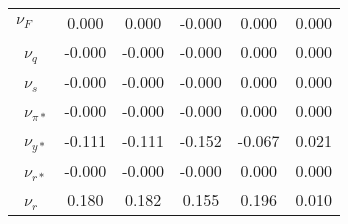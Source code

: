 \begin{small}
\begin{tabular}{lccccc}
\textbf{$ \nu_{F}          $}&0.000&0.000&-0.000&0.000&0.000\\\
\textbf{$ \nu_{q}          $}&-0.000&-0.000&-0.000&0.000&0.000\\\
\textbf{$ \nu_{s}          $}&-0.000&-0.000&-0.000&0.000&0.000\\\
\textbf{$ \nu_{\pi*}       $}&-0.000&-0.000&-0.000&0.000&0.000\\\
\textbf{$ \nu_{y*}         $}&-0.111&-0.111&-0.152&-0.067&0.021\\\
\textbf{$ \nu_{r*}         $}&-0.000&-0.000&-0.000&0.000&0.000\\\
\textbf{$ \nu_{r}          $}&0.180&0.182&0.155&0.196&0.010\\\hline
\end{tabular}
\end{small}